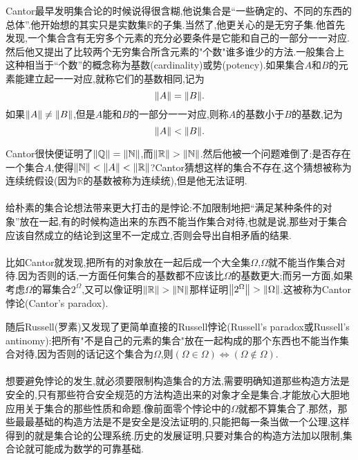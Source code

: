 \begin{frame}
	Cantor最早发明集合论的时候说得很含糊,他说集合是“一些确定的、不同的东西的总体”.他开始想的其实只是实数集$\mathbb{R}$的子集.当然了,他更关心的是无穷子集.他首先发现,一个集合含有无穷多个元素的充分必要条件是它能和自己的一部分一一对应.然后他又提出了比较两个无穷集合所含元素的"个数"谁多谁少的方法.一般集合上这种相当于“个数”的概念称为\alert{基数}(cardinality)或\alert{势}(potency).如果集合$A$和$B$的元素能建立起一一对应,就称它们的基数相同,记为\begin{equation}
		\norm{A} = \norm{B}.
	\end{equation}
	如果$\norm{A}\neq\norm{B}$,但是$A$能和$B$的一部分一一对应,则称$A$的基数小于$B$的基数,记为\begin{equation}
		\norm{A} < \norm{B}.
	\end{equation}
\end{frame}

\begin{frame}
	Cantor很快便证明了$\norm{\mathbb{Q}} = \norm{\mathbb{N}}$,而$\norm{\mathbb{R}} > \norm{\mathbb{N}}$.然后他被一个问题难倒了:是否存在一个集合$A$,使得$\norm{\mathbb{N}}<\norm{A}<\norm{\mathbb{R}}$?Cantor猜想这样的集合不存在,这个猜想被称为连续统假设(因为$\mathbb{R}$的基数被称为连续统),但是他无法证明.
	\\ \hspace*{\fill} \\%
	给朴素的集合论想法带来更大打击的是悖论:不加限制地把“满足某种条件的对象”放在一起,有的时候构造出来的东西不能当作集合对待,也就是说,那些对于集合应该自然成立的结论到这里不一定成立,否则会导出自相矛盾的结果.
	\\ \hspace*{\fill} \\%
	比如Cantor就发现,把所有的对象放在一起后成一个大全集$\Omega$,$\Omega$就不能当作集合对待.因为否则的话,一方面任何集合的基数都不应该比$\Omega$的基数更大;而另一方面,如果考虑$\Omega$的幂集合$2^\Omega$,又可以像证明$\norm{\mathbb{R}} > \norm{\mathbb{N}}$那样证明$\norm{2^\Omega}>\norm{\Omega}$.这被称为\alert{Cantor悖论}(Cantor's paradox).
\end{frame}

\begin{frame}
	随后Russell(罗素)又发现了更简单直接的\alert{Russell悖论}(Russell's paradox或Russell's antinomy):把所有"不是自己的元素的集合"放在一起构成的那个东西也不能当作集合对待,因为否则的话记这个集合为$\Omega$,则$(\Omega\in \Omega)\Longleftrightarrow (\Omega\notin \Omega)$.
	\\ \hspace*{\fill} \\%
	想要避免悖论的发生,就必须要限制构造集合的方法,需要明确知道那些构造方法是安全的,只有那些符合安全规范的方法构造出来的对象才全是集合,才能放心大胆地应用关于集合的那些性质和命题.像前面零个悖论中的$\Omega$就都不算集合了.那然，那些最最基础的构造方法是不是安全是没法证明的,只能把每一条当做一个公理,这样得到的就是集合论的公理系统.历史的发展证明,只要对集合的构造方法加以限制,集合论就可能成为数学的可靠基础.
	
	
\end{frame}

